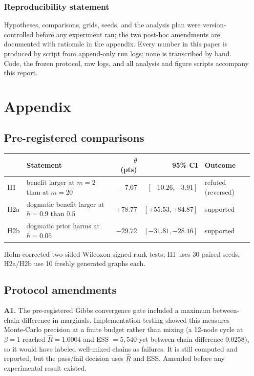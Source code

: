 \documentclass{article}
\begin{document}
\subsubsection*{Reproducibility statement}

Hypotheses, comparisons, grids, seeds, and the analysis plan were version-controlled before any
experiment ran; the two post-hoc amendments are documented with rationale in the appendix.
Every number in this paper is produced by script from append-only run logs; none is transcribed
by hand. Code, the frozen protocol, raw logs, and all analysis and figure scripts accompany
this report.




\appendix
\section{Appendix}

\subsection{Pre-registered comparisons}

\begin{center}
\small
\begin{tabular}{llrrl}
\toprule
& Statement & $\theta$ (pts) & 95\% CI & Outcome \\
\midrule
H1 & benefit larger at $m{=}2$ than at $m{=}20$ & $-7.07$ & $[-10.26,-3.91]$ & refuted (reversed) \\
H2a & dogmatic benefit larger at $h{=}0.9$ than $0.5$ & $+78.77$ & $[+55.53,+84.87]$ & supported \\
H2b & dogmatic prior harms at $h{=}0.05$ & $-29.72$ & $[-31.81,-28.16]$ & supported \\
\bottomrule
\end{tabular}
\end{center}
Holm-corrected two-sided Wilcoxon signed-rank tests; H1 uses 30 paired seeds, H2a/H2b use 10
freshly generated graphs each.

\subsection{Protocol amendments}

\textbf{A1.} The pre-registered Gibbs convergence gate included a maximum between-chain
difference in marginals. Implementation testing showed this measures Monte-Carlo precision at a
finite budget rather than mixing (a 12-node cycle at $\beta{=}1$ reached $\hat{R}=1.0004$ and
ESS $=5{,}540$ yet between-chain difference $0.0258$), so it would have labeled well-mixed
chains as failures. It is still computed and reported, but the pass/fail decision uses
$\hat{R}$ and ESS. Amended before any experimental result existed.
\end{document}
